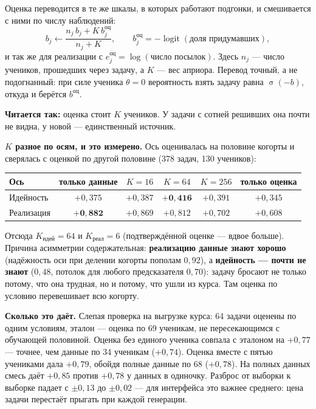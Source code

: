 \documentclass[11pt,a4paper]{article}
\newcommand{\sig}{\operatorname{\sigma}}
\begin{document}
Оценка переводится в те же шкалы, в которых работают подгонки, и смешивается с
ними по числу наблюдений:
\[
  b_j \leftarrow \frac{n_j\, b_j + K\, b^{\text{оц}}_j}{n_j + K},
  \qquad
  b^{\text{оц}}_j = -\operatorname{logit}(\text{доля придумавших}),
\]
и так же для реализации с $e^{\text{оц}}_j = \log(\text{число посылок})$.
Здесь $n_j$ --- число учеников, прошедших через задачу, а $K$ --- вес априора.
Перевод точный, а не подогнанный: при силе ученика $\theta = 0$ вероятность
взять задачу равна $\sig(-b)$, откуда и берётся $b^{\text{оц}}$.

\textbf{Читается так:} оценка стоит $K$ учеников. У задачи с сотней решивших она
почти не видна, у новой --- единственный источник.

\textbf{$K$ разное по осям, и это измерено.} Ось оценивалась на половине
когорты и сверялась с оценкой по другой половине (378 задач, 130 учеников):

\begin{center}
\begin{tabular}{@{}lccccc@{}}
\toprule
Ось & только данные & $K=16$ & $K=64$ & $K=256$ & только оценка \\
\midrule
Идейность  & $+0{,}375$ & $+0{,}387$ & $\mathbf{+0{,}416}$ & $+0{,}391$ & $+0{,}345$ \\
Реализация & $\mathbf{+0{,}882}$ & $+0{,}869$ & $+0{,}812$ & $+0{,}702$ & $+0{,}608$ \\
\bottomrule
\end{tabular}
\end{center}

Отсюда $K_{\text{идей}} = 64$ и $K_{\text{реал}} = 6$ (подтверждённой оценке ---
вдвое больше). Причина асимметрии содержательная: \textbf{реализацию данные
знают хорошо} (надёжность оси при делении когорты пополам $0{,}92$), а
\textbf{идейность --- почти не знают} ($0{,}48$, потолок для любого
предсказателя $0{,}70$): задачу бросают не только потому, что она трудная, но и
потому, что ушли из курса. Там оценка по условию перевешивает всю когорту.

\textbf{Сколько это даёт.} Слепая проверка на выгрузке курса: 64 задачи оценены
по одним условиям, эталон --- оценка по 69 ученикам, не пересекающимся с
обучающей половиной. Оценка без единого ученика совпала с эталоном на $+0{,}77$
--- точнее, чем данные по 34 ученикам ($+0{,}74$). Оценка вместе с пятью
учениками дала $+0{,}79$, обойдя полные данные по 68 ($+0{,}78$). На полных
данных смесь даёт $+0{,}85$ против $+0{,}78$ у данных в одиночку. Разброс от
выборки к выборке падает с $\pm0{,}13$ до $\pm0{,}02$ --- для интерфейса это
важнее среднего: цена задачи перестаёт прыгать при каждой генерации.
\end{document}
